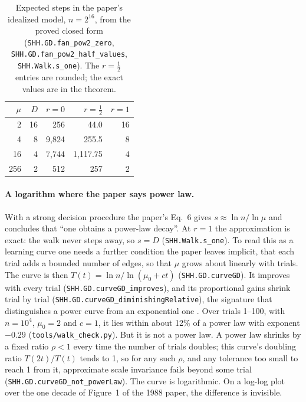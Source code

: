 \documentclass[11pt]{article}
\newcommand{\lean}[1]{\texttt{#1}}
\newcommand{\code}[1]{\texttt{#1}}
\begin{document}
\begin{table}[H]
\centering\small
\begin{tabular}{@{}rrrrr@{}}
\toprule
$\mu$ & $D$ & $r = 0$ & $r = \tfrac12$ & $r = 1$ \\
\midrule
2   & 16 & 256     & 44.0    & 16 \\
4   & 8  & 9{,}824 & 255.5   & 8 \\
16  & 4  & 7{,}744 & 1{,}117.75 & 4 \\
256 & 2  & 512     & 257 & 2 \\
\bottomrule
\end{tabular}
\caption{Expected steps in the paper's idealized model, $n = 2^{16}$, from
the proved closed form (\lean{SHH.GD.fan\_pow2\_zero},
\lean{SHH.GD.fan\_pow2\_half\_values}, \lean{SHH.Walk.s\_one}). The
$r = \tfrac12$ entries are rounded; the exact values are in the theorem.}
\label{tab:fan}
\end{table}

\paragraph{A logarithm where the paper says power law.} With a strong
decision procedure the paper's Eq.~6 gives $s \approx \ln n/\ln\mu$ and
concludes that ``one obtains a power-law decay''. At $r = 1$ the
approximation is exact: the walk never steps away, so $s = D$
(\lean{SHH.Walk.s\_one}). To read this as a learning curve one needs a
further condition the paper leaves implicit, that each trial adds a bounded
number of edges, so that $\mu$ grows about linearly with trials. The curve
is then $T(t) = \ln n/\ln(\mu_0 + ct)$ (\lean{SHH.GD.curveGD}). It improves
with every trial (\lean{SHH.GD.curveGD\_improves}), and its proportional
gains shrink trial by trial (\lean{SHH.GD.curveGD\_diminishingRelative}),
the signature that distinguishes a power curve from an exponential one
\citep{heathcote2000}. Over trials 1--100, with $n = 10^4$, $\mu_0 = 2$ and $c = 1$, it lies
within about 12\% of a power law with exponent $-0.29$
(\code{tools/walk\_check.py}). But it is not a power law. A power law
shrinks by a fixed ratio $\rho < 1$ every time the number of trials
doubles; this curve's doubling ratio $T(2t)/T(t)$ tends to 1, so for any
such $\rho$, and any tolerance too small to reach 1 from it, approximate
scale invariance fails beyond some trial (\lean{SHH.GD.curveGD\_not\_powerLaw}). The curve is logarithmic. On a
log-log plot over the one decade of Figure~1 of the 1988 paper, the
difference is invisible.
\end{document}
